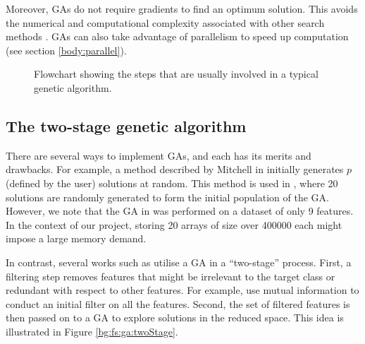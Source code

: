 \documentclass[12pt, twoside, a4paper]{report}
\begin{document}
Moreover, GAs do not require gradients to find an optimum solution. This avoids the numerical and computational complexity associated with other search methods \cite{RefWorks:242}. GAs can also take advantage of parallelism to speed up computation (see section \ref{body:parallel}).

\begin{figure}
\centering
{}
\caption{Flowchart showing the steps that are usually involved in a typical genetic algorithm.}
\label{bg:fs:ga:flowchart}
\end{figure}

\subsection{The two-stage genetic algorithm}
There are several ways to implement GAs, and each has its merits and drawbacks. For example, a method described by Mitchell in \cite{RefWorks:205} initially generates $p$ (defined by the user) solutions at random. This method is used in \cite{RefWorks:206}, where 20 solutions are randomly generated to form the initial population of the GA. However, we note that the GA in \cite{RefWorks:206} was performed on a dataset of only 9 features. In the context of our project, storing 20 arrays of size over 400000 each might impose a large memory demand.

In contrast, several works such as \cite{RefWorks:197, RefWorks:198, RefWorks:199, RefWorks:200, RefWorks:203} utilise a GA in a ``two-stage'' process. First, a filtering step removes features that might be irrelevant to the target class or redundant with respect to other features. For example, \cite{RefWorks:197, RefWorks:198, RefWorks:203} use mutual information to conduct an initial filter on all the features. Second, the set of filtered features is then passed on to a GA to explore solutions in the reduced space. This idea is illustrated in Figure \ref{bg:fs:ga:twoStage}.
\end{document}
